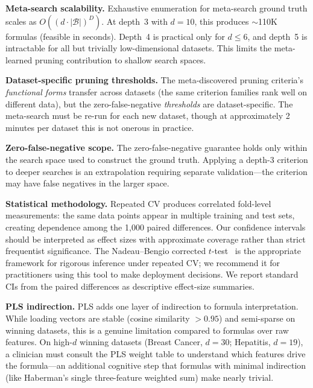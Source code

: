 \documentclass[journal]{IEEEtran}
\begin{document}
\textbf{Meta-search scalability.}
Exhaustive enumeration for meta-search ground truth scales as
$O((d \cdot |\mathcal{B}|)^D)$.  At depth~3 with $d = 10$,
this produces $\sim$110K formulas (feasible in seconds).  Depth~4
is practical only for $d \leq 6$, and depth~5 is intractable for
all but trivially low-dimensional datasets.  This limits the
meta-learned pruning contribution to shallow search spaces.

\textbf{Dataset-specific pruning thresholds.}
The meta-discovered pruning criteria's \emph{functional forms}
transfer across datasets (the same criterion families rank well on
different data), but the zero-false-negative \emph{thresholds} are
dataset-specific.  The meta-search must be re-run for each new
dataset, though at approximately 2 minutes per dataset this is
not onerous in practice.

\textbf{Zero-false-negative scope.}
The zero-false-negative guarantee holds only within the search
space used to construct the ground truth.  Applying a depth-3
criterion to deeper searches is an extrapolation requiring separate
validation---the criterion may have false negatives in the larger
space.

\textbf{Statistical methodology.}
Repeated CV produces correlated fold-level measurements: the same
data points appear in multiple training and test sets, creating
dependence among the 1{,}000 paired differences.  Our confidence
intervals should be interpreted as effect sizes with approximate
coverage rather than strict frequentist significance.  The
Nadeau--Bengio corrected $t$-test~\cite{nadeau2003inference} is the
appropriate framework for rigorous inference under repeated CV; we
recommend it for practitioners using this tool to make deployment
decisions.  We report standard CIs from the paired differences
as descriptive effect-size summaries.

\textbf{PLS indirection.}
PLS adds one layer of indirection to formula interpretation.  While
loading vectors are stable (cosine similarity $> 0.95$) and
semi-sparse on winning datasets, this is a genuine limitation
compared to formulas over raw features.  On high-$d$ winning
datasets (Breast Cancer, $d = 30$; Hepatitis, $d = 19$), a
clinician must consult the PLS weight table to understand which
features drive the formula---an additional cognitive step that
formulas with minimal indirection (like Haberman's single
three-feature weighted sum) make nearly trivial.

\end{document}
